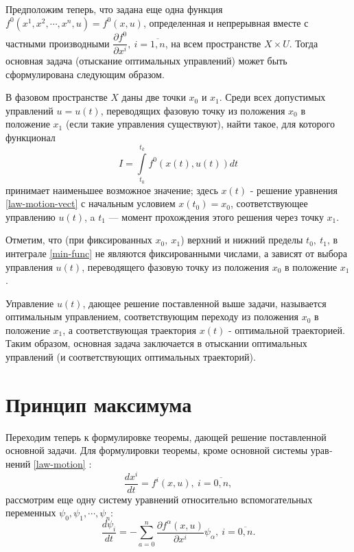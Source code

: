 \documentclass[14pt]{extreport}
\begin{document}
Предположим теперь, что задана еще одна функция\\ $f^0(x^1,x^2,\cdots,x^n,u)=f^0(x,u)$, определенная и непрерывная вместе с частными производными $\dfrac{\partial f^0}{\partial x^i},\ i = \overline{1,n}$, на всем пространстве $X \times U$. Тогда основная задача (отыскание оптимальных управлений) может быть сформулирована следующим образом.

В фазовом пространстве $X$ даны две точки $x_0$ и $x_1$. Среди всех допустимых управлений $u=u(t)$, переводя­щих фазовую точку из положения $x_0$ в положение $x_1$ (если такие управления существуют), найти такое, для которого функционал
\begin{equation}
\label{min-func}
I=\int \limits_{t_0}^{t_k} f^0(x(t),u(t))dt
\end{equation}
принимает наименьшее возможное значение; здесь $x(t)$ - решение уравнения \eqref{law-motion-vect} с начальным условием $x(t_0)=x_0$, соответствующее управлению $u(t)$, a $t_1$ — момент прохождения этого решения через точку $x_1$.

Отметим, что (при фиксированных $x_0,\ x_1$) верхний и нижний пределы $t_0,\ t_1$, в интеграле \eqref{min-func} не являются фиксированными числами, а зависят от выбора управ­ления $u(t)$, переводящего фазовую точку из положе­ния $x_0$ в положение $x_1$.

Управление $u(t)$, дающее решение поставленной выше задачи, называется оптимальным управлением, соответ­ствующим переходу из положения $x_0$ в положение $x_1$, а соответствующая траектория $x(t)$ - оптимальной тра­екторией. Таким образом, основная задача заключается в отыскании оптимальных управлений (и соответствую­щих оптимальных траекторий).

\section{Принцип максимума}
Переходим теперь к формулировке теоремы, дающей решение поставленной основной задачи. Для формулировки теоремы, кроме основной системы урав­нений \eqref{law-motion} \cite{roitenberg}:
\begin{equation}
\label{basic-system}
\dfrac{dx^i}{dt}=f^i(x,u),\ i=\overline{0,n},
\end{equation}
рассмотрим еще одну систему уравнений относительно вспомогательных переменных $\psi_0,\psi_1,\cdots,\psi_n$:
\begin{equation}
\label{linked-var}
\dfrac{d\psi_i}{dt}=-\sum\limits_{a=0}^{n}\dfrac{\partial f^{\alpha}(x,u)}{\partial x^i}\psi_{\alpha},\ i=\overline{0,n}.
\end{equation}
\end{document}

